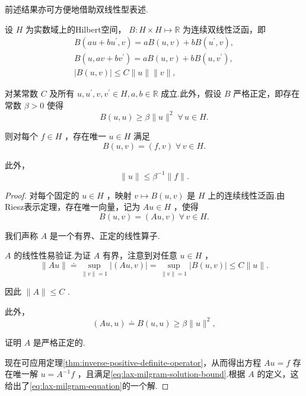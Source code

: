 前述结果亦可方便地借助双线性型表述.

\begin{theorem}\label{thm:lax-milgram}
设 $H$ 为实数域上的Hilbert空间， $B : H \times  H \mapsto  \mathbb{R}$ 为连续双线性泛函，即
\begin{gather*}
    B\left(  {{au} + b{u}^{\prime },v}\right)   = {aB}\left(  {u,v}\right)   + {bB}\left(  {{u}^{\prime },v}\right)  ,\\
    B\left(  {u,{av} + b{v}^{\prime }}\right)   = {aB}\left(  {u,v}\right)   + {bB}\left(  {u,{v}^{\prime }}\right)  ,\\
    \left| {B\left(  {u,v}\right)  }\right|  \leq  C\| u\| \| v\| ,
\end{gather*}


对某常数 $C$ 及所有 $u,{u}^{\prime },v,{v}^{\prime } \in  H,a,b \in  \mathbb{R}$ 成立.此外，假设 $B$ 严格正定，即存在常数 $\beta  > 0$ 使得
\[
B\left(  {u,u}\right)   \geq  \beta \| u{\| }^{2}\;\forall\,u \in  H.
\]

则对每个 $f \in  H$ ，存在唯一 $u \in  H$ 满足
\begin{equation}\tag{5.22}\label{eq:lax-milgram-equation}
B\left(  {u,v}\right)   = \left( {f,v}\right) \;\forall\,v \in  H.
\end{equation}

此外，
\begin{equation}\tag{5.23}\label{eq:lax-milgram-solution-bound}
\| u\|  \leq  {\beta }^{-1}\| f\| .
\end{equation}

\end{theorem}

\begin{proof}
对每个固定的 $u \in  H$ ，映射 $v \mapsto  B\left(  {u,v}\right)$ 是 $H$ 上的连续线性泛函.由Riesz表示定理，存在唯一向量，记为 ${Au} \in  H$ ，使得
\[
B\left(  {u,v}\right)   = \left( {{Au},v}\right) \;\forall\,v \in  H.
\]

我们声称 $A$ 是一个有界、正定的线性算子.

$A$ 的线性性易验证.为证 $A$ 有界，注意到对任意 $u \in  H$ ，
\[
\| {Au}\|  \doteq  \mathop{\sup }\limits_{{\| v\|  = 1}}\left| \left( {{Au},v}\right) \right|  = \mathop{\sup }\limits_{{\| v\|  = 1}}\left| {B\left(  {u,v}\right)  }\right|  \leq  C\| u\| .
\]

因此 $\| A\|  \leq  C$ .

此外，
\[
\left( {{Au},u}\right)  \doteq  B\left(  {u,u}\right)   \geq  \beta \| u{\| }^{2},
\]

证明 $A$ 是严格正定的.

现在可应用定理\ref{thm:inverse-positive-definite-operator}，从而得出方程 ${Au} = f$ 存在唯一解 $u = {A}^{-1}f$ ，且满足\eqref{eq:lax-milgram-solution-bound}.根据 $A$ 的定义，这给出了\eqref{eq:lax-milgram-equation}的一个解.
\end{proof}

